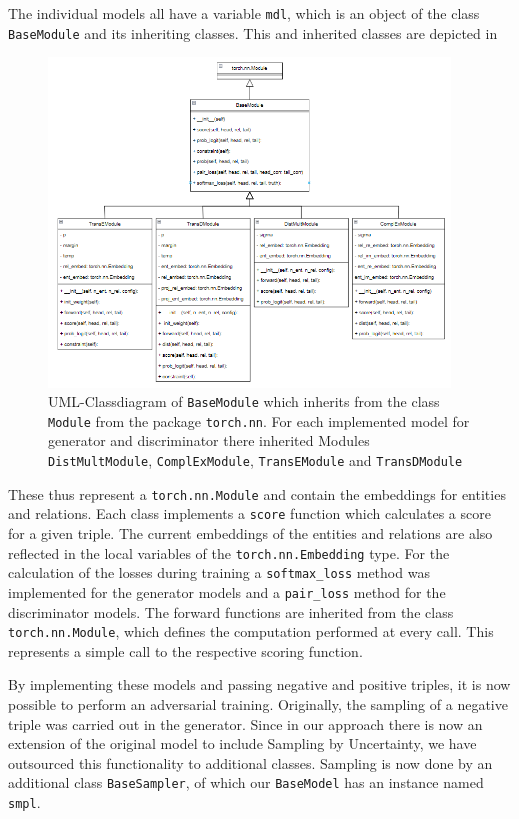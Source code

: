 The individual models all have a variable \texttt{mdl}, which is an object of the class \texttt{BaseModule} and its inheriting classes.
This and inherited classes are depicted in 
\begin{figure}[t]
  \centering
    \includegraphics[width=0.95\textwidth]{figures/BaseModule.PNG}
  \caption{\ac{UML}-Classdiagram of \texttt{BaseModule} which inherits from the class \texttt{Module} from the package \texttt{torch.nn}.
  For each implemented model for generator and discriminator there inherited Modules \texttt{DistMultModule},  \texttt{ComplExModule},  \texttt{TransEModule} and  \texttt{TransDModule}}
  \label{fig:basemodule_classdiagram}
\end{figure}
These thus represent a \texttt{torch.nn.Module} and contain the embeddings for entities and relations.
Each class implements a \texttt{score} function which calculates a score for a given triple.
The current embeddings of the entities and relations are also reflected in the local variables of the \texttt{torch.nn.Embedding} type.
For the calculation of the losses during training a \texttt{softmax\_loss} method was implemented for the generator models and a \texttt{pair\_loss} method for the discriminator models.
The forward functions are inherited from the class \texttt{torch.nn.Module}, which defines the computation performed at every call.
This represents a simple call to the respective scoring function.

By implementing these models and passing negative and positive triples, it is now possible to perform an adversarial training.
Originally, the sampling of a negative triple was carried out in the generator.
Since in our approach there is now an extension of the original model to include Sampling by Uncertainty, we have outsourced this functionality to additional classes.
Sampling is now done by an additional class \texttt{BaseSampler}, of which our \texttt{BaseModel} has an instance named \texttt{smpl}.
